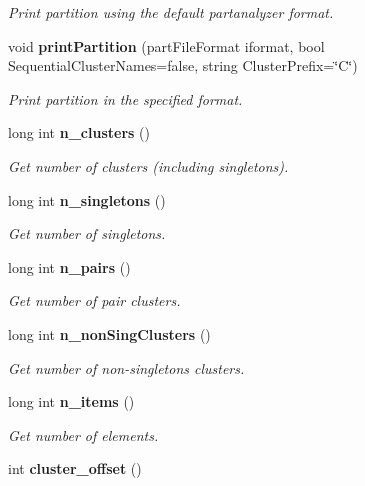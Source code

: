 \begin{CompactItemize}
\begin{CompactList}\small\item\em Print partition using the default partanalyzer format. \item\end{CompactList}\item 
void {\bf print\-Partition} (part\-File\-Format iformat, bool Sequential\-Cluster\-Names=false, string Cluster\-Prefix=\char`\"{}C\char`\"{})\label{classPartition_a12}

\begin{CompactList}\small\item\em Print partition in the specified format. \item\end{CompactList}\item 
long int {\bf n\_\-clusters} ()\label{classPartition_a13}

\begin{CompactList}\small\item\em Get number of clusters (including singletons). \item\end{CompactList}\item 
long int {\bf n\_\-singletons} ()\label{classPartition_a14}

\begin{CompactList}\small\item\em Get number of singletons. \item\end{CompactList}\item 
long int {\bf n\_\-pairs} ()\label{classPartition_a15}

\begin{CompactList}\small\item\em Get number of pair clusters. \item\end{CompactList}\item 
long int {\bf n\_\-non\-Sing\-Clusters} ()\label{classPartition_a16}

\begin{CompactList}\small\item\em Get number of non-singletons clusters. \item\end{CompactList}\item 
long int {\bf n\_\-items} ()\label{classPartition_a17}

\begin{CompactList}\small\item\em Get number of elements. \item\end{CompactList}\item 
int {\bf cluster\_\-offset} ()\label{classPartition_a18}


\end{CompactItemize}
